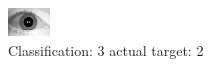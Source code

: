 \begin{figure}[h!]
\begin{center}
\includegraphics[width=0.60\columnwidth]{figures/ID1756_class_3_target_2.png}
\end{center}
\caption{ Classification: 3 actual target: 2}
\label{fig:ID1756_class_3_target_2}
\end{figure}
